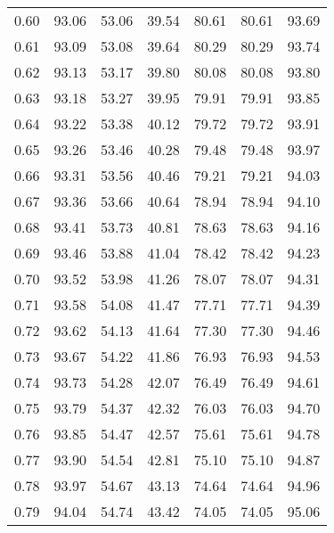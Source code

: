 \begin{tabular}{|c|c|c|c|c|c|c|}
      0.60 &     93.06 &     53.06 &      39.54 &   80.61 &      80.61 &         93.69 \\
      0.61 &     93.09 &     53.08 &      39.64 &   80.29 &      80.29 &         93.74 \\
      0.62 &     93.13 &     53.17 &      39.80 &   80.08 &      80.08 &         93.80 \\
      0.63 &     93.18 &     53.27 &      39.95 &   79.91 &      79.91 &         93.85 \\
      0.64 &     93.22 &     53.38 &      40.12 &   79.72 &      79.72 &         93.91 \\
      0.65 &     93.26 &     53.46 &      40.28 &   79.48 &      79.48 &         93.97 \\
      0.66 &     93.31 &     53.56 &      40.46 &   79.21 &      79.21 &         94.03 \\
      0.67 &     93.36 &     53.66 &      40.64 &   78.94 &      78.94 &         94.10 \\
      0.68 &     93.41 &     53.73 &      40.81 &   78.63 &      78.63 &         94.16 \\
      0.69 &     93.46 &     53.88 &      41.04 &   78.42 &      78.42 &         94.23 \\
      0.70 &     93.52 &     53.98 &      41.26 &   78.07 &      78.07 &         94.31 \\
      0.71 &     93.58 &     54.08 &      41.47 &   77.71 &      77.71 &         94.39 \\
      0.72 &     93.62 &     54.13 &      41.64 &   77.30 &      77.30 &         94.46 \\
      0.73 &     93.67 &     54.22 &      41.86 &   76.93 &      76.93 &         94.53 \\
      0.74 &     93.73 &     54.28 &      42.07 &   76.49 &      76.49 &         94.61 \\
      0.75 &     93.79 &     54.37 &      42.32 &   76.03 &      76.03 &         94.70 \\
      0.76 &     93.85 &     54.47 &      42.57 &   75.61 &      75.61 &         94.78 \\
      0.77 &     93.90 &     54.54 &      42.81 &   75.10 &      75.10 &         94.87 \\
      0.78 &     93.97 &     54.67 &      43.13 &   74.64 &      74.64 &         94.96 \\
      0.79 &     94.04 &     54.74 &      43.42 &   74.05 &      74.05 &         95.06 \\

\end{tabular}
